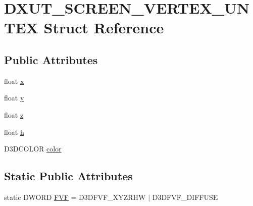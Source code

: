 \hypertarget{struct_d_x_u_t___s_c_r_e_e_n___v_e_r_t_e_x___u_n_t_e_x}{
\section{DXUT\_\-SCREEN\_\-VERTEX\_\-UNTEX Struct Reference}
\label{struct_d_x_u_t___s_c_r_e_e_n___v_e_r_t_e_x___u_n_t_e_x}
}
\subsection*{Public Attributes}
\begin{DoxyCompactItemize}
\item 
float \hyperlink{struct_d_x_u_t___s_c_r_e_e_n___v_e_r_t_e_x___u_n_t_e_x_a8385e54d50531a96114e6c2e1de0a2c3}{x}
\item 
float \hyperlink{struct_d_x_u_t___s_c_r_e_e_n___v_e_r_t_e_x___u_n_t_e_x_a7dba6abd9d324dd56538daabdaa21fe6}{y}
\item 
float \hyperlink{struct_d_x_u_t___s_c_r_e_e_n___v_e_r_t_e_x___u_n_t_e_x_a7289e8e6f39d6c0a89fa299431b4408d}{z}
\item 
float \hyperlink{struct_d_x_u_t___s_c_r_e_e_n___v_e_r_t_e_x___u_n_t_e_x_ab1a4ff23bc7135fb547dfde18a551ab6}{h}
\item 
D3DCOLOR \hyperlink{struct_d_x_u_t___s_c_r_e_e_n___v_e_r_t_e_x___u_n_t_e_x_aad704c036aa8cb76b52a1a46cc3ace70}{color}
\end{DoxyCompactItemize}
\subsection*{Static Public Attributes}
\begin{DoxyCompactItemize}
\item 
static DWORD \hyperlink{struct_d_x_u_t___s_c_r_e_e_n___v_e_r_t_e_x___u_n_t_e_x_ad33ec3f4bf46dbff5fca5b39d0f72a82}{FVF} = D3DFVF\_\-XYZRHW $|$ D3DFVF\_\-DIFFUSE
\end{DoxyCompactItemize}


